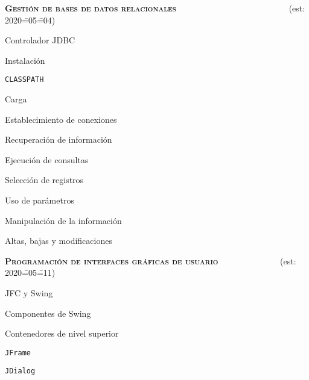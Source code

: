 \begin{longenum}
\begin{longenum}
\begin{longenum}
\begin{longenum}
            \end{longenum}
        \end{longenum}
    \end{longenum}
    \item \textbf{\textsc{Gestión de bases de datos relacionales}} \ \ \ \ \ \ \ \ \ \ \ \ \ \ \ \ \ \ \ \ \ \ \ \ \ \ (est: 2020\==05\==04)
    \begin{longenum}
        \item Controlador JDBC
        \begin{longenum}
            \item Instalación
            \item \texttt{CLASSPATH}
            \item Carga
        \end{longenum}
        \item Establecimiento de conexiones
        \item Recuperación de información
        \begin{longenum}
            \item Ejecución de consultas
            \item Selección de registros
            \item Uso de parámetros
        \end{longenum}
        \item Manipulación de la información
        \begin{longenum}
            \item Altas, bajas y modificaciones
        \end{longenum}
    \end{longenum}
    \item \textbf{\textsc{Programación de interfaces gráficas de usuario}} \ \ \ \ \ \ \ \ \ \opcional\ \ \ \ \ (est: 2020\==05\==11)
    \begin{longenum}
        \item JFC y Swing
        \item Componentes de Swing
        \item Contenedores de nivel superior
        \begin{longenum}
            \item \texttt{JFrame}
            \item \texttt{JDialog}

\end{longenum}
\end{longenum}
\end{longenum}
